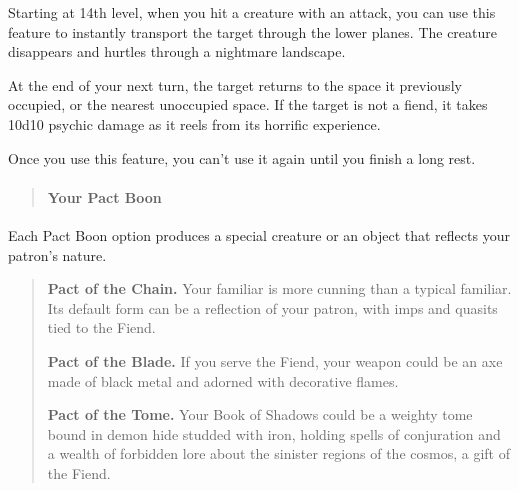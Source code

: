\documentclass[
]{article}
\begin{document}
Starting at 14th level, when you hit a creature with an attack, you can
use this feature to instantly transport the target through the lower
planes. The creature disappears and hurtles through a nightmare
landscape.

At the end of your next turn, the target returns to the space it
previously occupied, or the nearest unoccupied space. If the target is
not a fiend, it takes 10d10 psychic damage as it reels from its horrific
experience.

Once you use this feature, you can't use it again until you finish a
long rest.

\begin{quote}
\mbox{}%
\hypertarget{your-pact-boon}{%
\paragraph{Your Pact Boon}\label{your-pact-boon}}
\end{quote}

Each Pact Boon option produces a special creature or an object that
reflects your patron's nature.

\begin{quote}
\textbf{Pact of the Chain.} Your familiar is more cunning than a typical
familiar. Its default form can be a reflection of your patron, with imps
and quasits tied to the Fiend.

\textbf{Pact of the Blade.} If you serve the Fiend, your weapon could be
an axe made of black metal and adorned with decorative flames.

\textbf{Pact of the Tome.} Your Book of Shadows could be a weighty tome
bound in demon hide studded with iron, holding spells of conjuration and
a wealth of forbidden lore about the sinister regions of the cosmos, a
gift of the Fiend.
\end{quote}
\end{document}
